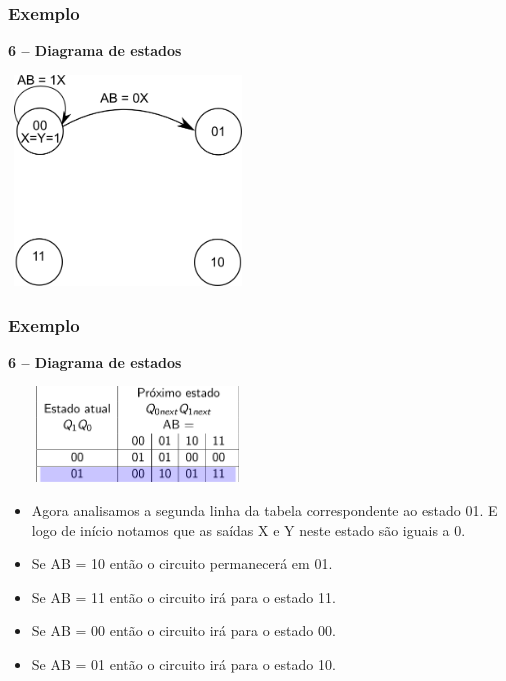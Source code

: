 \documentclass{beamer}
\begin{document}
\begin{frame}
  \frametitle{Exemplo}
  \textbf{6 – Diagrama de estados}
   \begin{center}
    \includegraphics[height = 2.2in, width = 2.5in]
      {images/Diagrama_de_estado_ex3.png}
   \end{center}
\end{frame}

\begin{frame}
  \frametitle{Exemplo}
  \textbf{6 – Diagrama de estados}
  \begin{center}
   \includegraphics[height = 1in, width = 2.7in]
    {images/Diagrama_estado_tabela_2.png}
  \end{center}

  \begin{itemize}
   \item Agora analisamos a segunda linha da tabela correspondente ao estado 
    01. E logo de início notamos que as saídas X e Y neste estado são iguais a 
    0.
    \pause
   \item Se AB = 10 então o circuito permanecerá em 01.
    \pause
   \item Se AB = 11 então o circuito irá para o estado 11.
    \pause
   \item Se AB = 00 então o circuito irá para o estado 00.
    \pause
   \item Se AB = 01 então o circuito irá para o estado 10. 
  \end{itemize} 
\end{frame}
\end{document}
